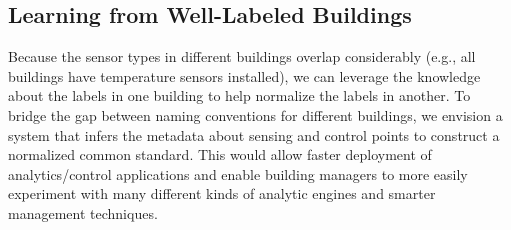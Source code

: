 \subsection{Learning from Well-Labeled Buildings}
Because the sensor types in different buildings 
overlap considerably (e.g., all buildings have temperature sensors installed),
we can leverage the knowledge about the labels in one building to 
help normalize the labels in another.
To bridge the gap between naming conventions for different buildings, we envision 
a system that infers the metadata about sensing and control points to construct a normalized 
common standard.
This would allow faster deployment of analytics/control applications and enable
building managers to more easily experiment with many different kinds 
of analytic engines and smarter management techniques. 


